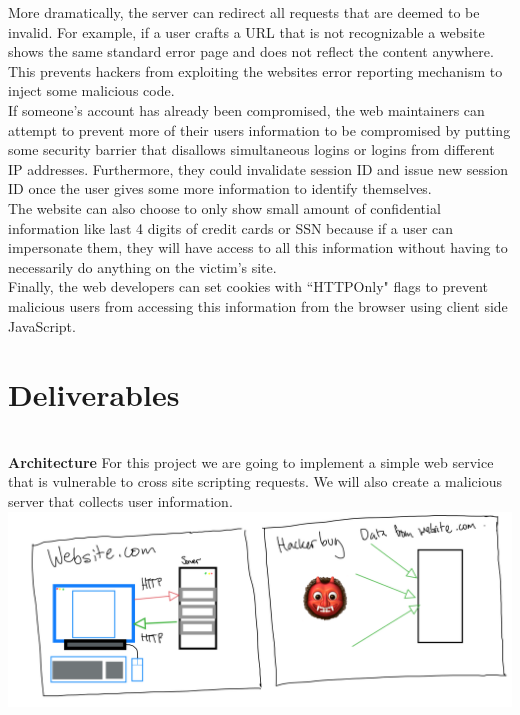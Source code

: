 \documentclass[11pt]{article}
\begin{document}
More dramatically, the server can redirect all requests that are deemed to be invalid. For example, if a user crafts a URL that is not recognizable a website shows the same standard error page and does not reflect the content anywhere. This prevents hackers from exploiting the websites error reporting mechanism to inject some malicious code. \\

If someone's account has already been compromised, the web maintainers can attempt to prevent more of their users information to be compromised by putting some security barrier that disallows simultaneous logins or logins from different IP addresses. Furthermore, they could invalidate session ID and issue new session ID once the user gives some more information to identify themselves.\\

The website can also choose to only show small amount of confidential information like last 4 digits of credit cards or SSN because if a user can impersonate them, they will have access to all this information without having to necessarily do anything on the victim's site.\\

Finally, the web developers can set cookies with ``HTTPOnly" flags to prevent malicious users from accessing this information from the browser using client side JavaScript.\\

\section{Deliverables}\\

\textbf{Architecture}
For this project we are going to implement a simple web service that is vulnerable to cross site scripting requests. We will also create a malicious server that collects user information.\\

\includegraphics[width = 14cm]{architecture.png}
\end{document}
